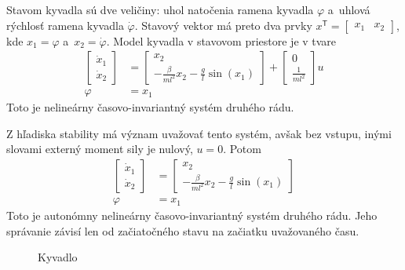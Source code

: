 \documentclass[a4paper, 10pt, ]{article}
\begin{document}
Stavom kyvadla sú dve veličiny: uhol natočenia ramena kyvadla $\varphi$ a~uhlová rýchlosť ramena kyvadla $\dot\varphi$. Stavový vektor má preto dva prvky $x^{\mathsf{T}} = \begin{bmatrix} x_1 & x_2	\end{bmatrix}$, kde $x_1 = \varphi$ a~$x_2 = \dot\varphi$. Model kyvadla v stavovom priestore je v tvare
\begin{subequations}
	\begin{align}
		\begin{bmatrix}
			\dot{x}_1 \\ \dot{x}_2
		\end{bmatrix}
		&=
		\begin{bmatrix}
			x_2 \\ - \frac{\beta}{ml^2} x_2 - \frac{g}{l} \sin(x_1)
		\end{bmatrix}
		+
		\begin{bmatrix}
			0 \\ \frac{1}{ml^2}
		\end{bmatrix}
		u \\
		\varphi &= x_1
	\end{align}
\end{subequations}
Toto je nelineárny časovo-invariantný systém druhého rádu.




Z hľadiska stability má význam uvažovať tento systém, avšak bez vstupu, inými slovami externý moment sily je nulový, $u = 0$. Potom
\begin{subequations}
	\begin{align} \label{fajnVektRov}
		\begin{bmatrix}
			\dot{x}_1 \\ \dot{x}_2
		\end{bmatrix}
		&=
		\begin{bmatrix}
			x_2 \\ - \frac{\beta}{ml^2} x_2 - \frac{g}{l} \sin(x_1)
		\end{bmatrix}
 \\
		\varphi &= x_1
	\end{align}
\end{subequations}
Toto je autonómny nelineárny časovo-invariantný systém druhého rádu. Jeho správanie závisí len od začiatočného stavu na začiatku uvažovaného času.




\begin{figure}[t]
	\centering

\caption{Kyvadlo}
\label{Kyvadlo}

\vspace{-2mm}
\end{figure}
\end{document}

